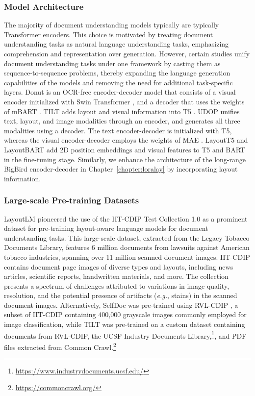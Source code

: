 \subsubsection{Model Architecture}

The majority of document understanding models typically are typically Transformer encoders. This choice is motivated by treating document understanding tasks as natural language understanding tasks, emphasizing comprehension and representation over generation. However, certain studies unify document understanding tasks under one framework by casting them as sequence-to-sequence problems, thereby expanding the language generation capabilities of the models and removing the need for additional task-specific layers. Donut \citep{kim2022ocr} is an \ac{OCR}-free encoder-decoder model that consists of a visual encoder initialized with Swin Transformer \citep{liu2021swin}, and a decoder that uses the weights of mBART \citep{liu2020multilingual}. TILT \citep{powalski2021going} adds layout and visual information into \ac{T5} \citep{raffel2020exploring}. UDOP \citep{tang2023unifying} unifies text, layout, and image modalities through an encoder, and generates all three modalities using a decoder. The text encoder-decoder is initialized with T5, whereas the visual encoder-decoder employs the weights of MAE \citep{he2022masked}. LayoutT5 and LayoutBART \citep{tanaka2021visualmrc} add 2D position embeddings and visual features to \ac{T5} and \ac{BART} \citep{lewis2019bart} in the fine-tuning stage. Similarly, we enhance the architecture of the long-range BigBird encoder-decoder \citep{zaheer2020big} in Chapter~\ref{chapter:loralay} by incorporating layout information.

\subsubsection{Large-scale Pre-training Datasets}
\label{section:related-document-understanding-pretraining-datasets}

LayoutLM \citep{xu2020layoutlm} pioneered the use of the IIT-CDIP Test Collection 1.0 \citep{lewis2006building} as a prominent dataset for pre-training layout-aware language models for document understanding tasks. This large-scale dataset, extracted from the Legacy Tobacco Documents Library, features 6 million documents from lawsuits against American tobacco industries, spanning over 11 million scanned document images. IIT-CDIP contains document page images of diverse types and layouts, including news articles, scientific reports, handwritten materials, and more. The collection presents a spectrum of challenges attributed to variations in image quality, resolution, and the potential presence of artifacts (\textit{e.g.}, stains) in the scanned document images. Alternatively, SelfDoc \citep{li2021selfdoc} was pre-trained using RVL-CDIP \citep{harley2015evaluation}, a subset of IIT-CDIP containing 400,000 grayscale images commonly employed for image classification, while TILT \citet{powalski2021going} was pre-trained on a custom dataset containing documents from RVL-CDIP, the UCSF Industry Documents Library,\footnote{\url{https://www.industrydocuments.ucsf.edu/}}, and PDF files extracted from Common Crawl.\footnote{\url{https://commoncrawl.org/}}

